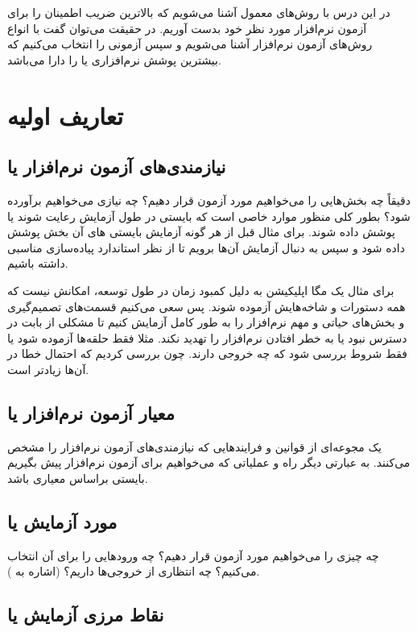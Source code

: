 \documentclass[a4paper]{article}
\begin{document}
در این درس با روش‌های معمول آشنا می‌شویم که بالاترین ضریب اطمینان را برای آزمون
نرم‌افزار مورد نظر خود بدست آوریم. در حقیقت می‌توان گفت با انواع روش‌های آزمون
نرم‌افزار آشنا می‌شویم و سپس آزمونی را انتخاب می‌کنیم که بیشترین پوشش نرم‌افزاری
یا  را دارا می‌باشد.

\section{تعاریف اولیه}

\subsection{نیازمندی‌های آزمون نرم‌افزار یا }

دقیقاً چه بخش‌هایی را می‌خواهیم مورد آزمون قرار دهیم؟ چه نیازی می‌خواهیم برآورده
شود؟ بطور کلی منظور موارد خاصی است که بایستی در طول آزمایش رعایت شوند یا پوشش
داده شوند. برای مثال قبل از هر گونه آزمایش بایستی های آن بخش
پوشش داده شود و سپس به دنبال آزمایش آن‌ها برویم تا از نظر استاندارد پیاده‌سازی
مناسبی داشته باشیم.

برای مثال یک مگا اپلیکیشن به دلیل کمبود زمان در طول توسعه، امکانش نیست که همه
دستورات و شاخه‌هایش آزموده شوند. پس سعی می‌کنیم قسمت‌های تصمیم‌گیری و بخش‌های
حیاتی و مهم نرم‌افزار را به طور کامل آزمایش کنیم تا مشکلی از بابت در دسترس نبود
یا به خطر افتادن نرم‌افزار را تهدید نکند. مثلا فقط حلقه‌ها آزموده شود یا فقط
شروط بررسی شود که چه خروجی دارند. چون بررسی کردیم که احتمال خطا در آن‌ها زیاد‌تر
است.

\subsection{معیار آزمون نرم‌افزار یا }

یک مجوعه‌ای از قوانین و فرایند‌هایی که نیازمندی‌های آزمون نرم‌افزار را مشخص
می‌کنند. به عبارتی دیگر راه و عملیاتی که می‌خواهیم برای آزمون نرم‌افزار پیش
بگیریم بایستی براساس معیاری باشد.

\subsection{مورد آزمایش یا }

چه چیزی را می‌خواهیم مورد آزمون قرار دهیم؟ چه ورود‌هایی را برای آن انتخاب
می‌کنیم؟ چه انتظاری از خروجی‌ها داریم؟ (اشاره به ).

\subsection{نقاط مرزی آزمایش یا }
\end{document}
